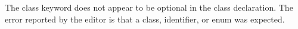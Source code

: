 The class keyword does not appear to be optional in the class
declaration. The error reported by the editor is that a class,
identifier, or enum was expected.

